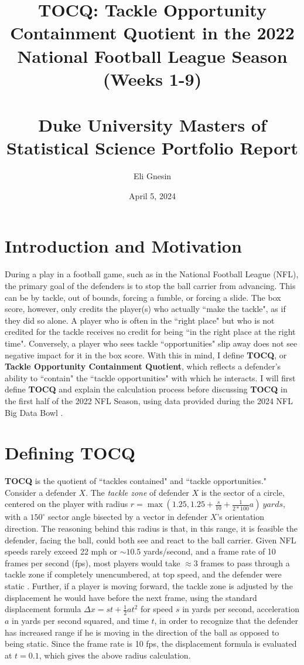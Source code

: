 \documentclass{article}
\title{TOCQ: Tackle Opportunity Containment Quotient in the 2022 National Football League Season (Weeks 1-9) \\ \small \quad \\
 \large Duke University Masters of Statistical Science Portfolio Report}
\author{Eli Gnesin}
\date{April 5, 2024}
\begin{document}
\maketitle

\section{Introduction and Motivation}

During a play in a football game, such as in the National Football League (NFL), the primary goal of the defenders is to stop the ball carrier from advancing. This can be by tackle, out of bounds, forcing a fumble, or forcing a slide. The box score, however, only credits the player(s) who actually ``make the tackle", as if they did so alone. A player who is often in the ``right place" but who is not credited for the tackle receives no credit for being ``in the right place at the right time". Conversely, a player who sees tackle ``opportunities" slip away does not see negative impact for it in the box score. With this in mind, I define \textbf{TOCQ}, or \textbf{Tackle Opportunity Containment Quotient}, which reflects a defender's ability to ``contain" the ``tackle opportunities" with which he interacts. I will first define \textbf{TOCQ} and explain the calculation process before discussing \textbf{TOCQ} in the first half of the 2022 NFL Season, using data provided during the 2024 NFL Big Data Bowl \cite{big_data_bowl}.

\section{Defining TOCQ}

\textbf{TOCQ} is the quotient of ``tackles contained" and ``tackle opportunities." Consider a defender $X$. The \textit{tackle zone} of defender $X$ is the sector of a circle, centered on the player with radius $r = \max(1.25, 1.25 + \frac{s}{10} + \frac{1}{2*100}a)\ yards$, with a $150^{\circ}$ sector angle bisected by a vector in defender $X$'s orientation direction. The reasoning behind this radius is that, in this range, it is feasible the defender, facing the ball, could both see and react to the ball carrier. Given NFL speeds rarely exceed 22 mph or $\sim 10.5$ yards/second, and a frame rate of 10 frames per second (fps), most players would take $\approx 3$ frames to pass through a tackle zone if completely unencumbered, at top speed, and the defender were static \cite{Sutelan_2023}. Further, if a player is moving forward, the tackle zone is adjusted by the displacement he would have before the next frame, using the standard displacement formula $\Delta x = st + \frac{1}{2}at^2$ for speed $s$ in yards per second, acceleration $a$ in yards per second squared, and time $t$, in order to recognize that the defender has increased range if he is moving in the direction of the ball as opposed to being static. Since the frame rate is 10 fps, the displacement formula is evaluated at $t = 0.1$, which gives the above radius calculation.
\end{document}
